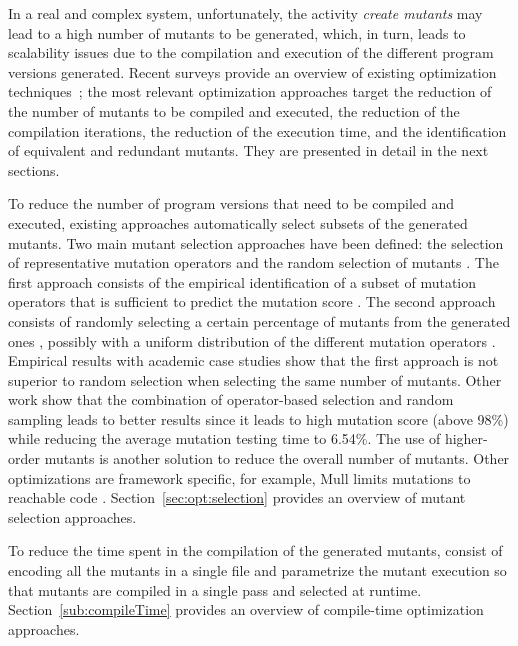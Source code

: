 In a real and complex system, unfortunately, the activity \emph{create mutants} may lead to a high number of mutants to be generated, which, in turn, leads to scalability issues due to the compilation and execution of the different program versions generated. Recent surveys provide an overview of existing optimization techniques~\cite{ferrari2018systematic};
the most relevant optimization approaches target the reduction of the number of mutants to be compiled and executed, 
the reduction of the compilation iterations, the reduction of the execution time, and the identification of equivalent and redundant mutants. They are presented in detail in the next sections.

To reduce the number of program versions that need to be compiled and executed, existing approaches automatically select subsets of the generated mutants. Two main mutant selection approaches have been defined: the selection of representative mutation operators and the random selection of mutants \cite{zhang2010operator}. The first approach consists of the empirical identification of a subset of mutation operators that is sufficient to predict the mutation score \cite{siami2008sufficient,barbosa2001toward}. The second approach consists of randomly selecting a certain percentage of mutants from the generated ones \cite{wong1995reducing}, possibly with a uniform distribution of the different mutation operators \cite{zhang2010operator}. Empirical results with academic case studies \cite{zhang2010operator} show that the first approach is not superior to random selection when selecting the same number of mutants. Other work \cite{zhang2013operator} show that the combination of operator-based selection and random sampling leads to better results since it leads to high mutation score (above 98\%) while reducing the average mutation testing time to 6.54\%. The use of higher-order mutants is another solution to reduce the overall number of mutants. 
Other optimizations are framework specific, for example, Mull limits mutations to reachable code \cite{hariri2018srciror}. Section~\ref{sec:opt:selection} provides an overview of mutant selection approaches.

To reduce the time spent in the compilation of the generated mutants,  \cite{untch1993mutation} consist of encoding all the mutants in a single file and parametrize the mutant execution so that mutants are compiled in a single pass and selected at runtime. Section~\ref{sub:compileTime} provides an overview of compile-time optimization approaches.

